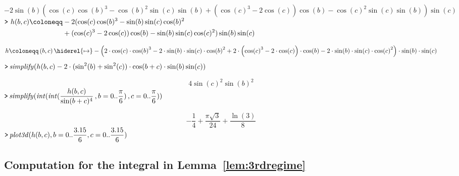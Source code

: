 \documentclass{article}
\theoremstyle{definition}
\newcounter{col}
\begin{document}
\begin{dmath}\label{(4)}
-2 \sin \! \left(b \right) \left(\cos \! \left(c \right) \cos \! \left(b \right)^{3}-\cos \! \left(b \right)^{2} \sin \! \left(c \right) \sin \! \left(b \right)+\left(\cos \! \left(c \right)^{3}-2 \cos \! \left(c \right)\right) \cos \! \left(b \right)-\cos \! \left(c \right)^{2} \sin \! \left(c \right) \sin \! \left(b \right)\right) \sin \! \left(c \right)
\end{dmath}
\mapleinput
{ \(\begin{aligned}  \texttt{>\,} \,h (b ,c)\coloneqq &-2 (\cos (c) \cos (b)^{3}-\sin (b) \sin (c) \cos (b)^{2}\\&+(\cos (c)^{3}-2 \cos (c)) \cos (b)-\sin (b) \sin (c) \cos (c)^{2}) \sin (b) \sin (c) \end{aligned}\) }

\begin{dmath}\label{(5)}
h \coloneqq \left(b ,c \right)\hiderel{\mapsto }-\left(2\cdot \cos \! \left(c \right)\cdot \cos \! \left(b \right)^{3}-2\cdot \sin \! \left(b \right)\cdot \sin \! \left(c \right)\cdot \cos \! \left(b \right)^{2}+2\cdot \left(\cos \! \left(c \right)^{3}-2\cdot \cos \! \left(c \right)\right)\cdot \cos \! \left(b \right)-2\cdot \sin \! \left(b \right)\cdot \sin \! \left(c \right)\cdot \cos \! \left(c \right)^{2}\right)\cdot \sin \! \left(b \right)\cdot \sin \! \left(c \right)
\end{dmath}
\mapleinput
{$ \displaystyle \texttt{>\,} \mathit{simplify} (h (b ,c)-2\cdot (\sin^{2}(b)+\sin^{2}(c))\cdot \cos (b +c)\cdot  \sin (b) \sin (c)) $}

\begin{dmath}\label{(6)}
4 \sin \! \left(c \right)^{2} \sin \! \left(b \right)^{2}
\end{dmath}
\mapleinput
{$ \displaystyle \texttt{>\,} \mathit{simplify} (\mathit{int} (\mathit{int} (\frac{h (b ,c)}{\sin (b +c)^{4}}\,,b =0..\frac{\pi}{6})\,,c =0..\frac{\pi}{6})) $}

\begin{dmath}\label{(7)}
-\frac{1}{4}+\frac{\pi  \sqrt{3}}{24}+\frac{\ln \! \left(3\right)}{8}
\end{dmath}
\mapleinput
{$ \displaystyle \texttt{>\,} \mathit{plot3d} (h (b ,c),b =0..\frac{ 3.15}{6},c =0..\frac{ 3.15}{6}) $}

{}


\subsection{Computation for the integral in Lemma~\ref{lem:3rdregime}}\label{subsec:integral_v2}
\end{document}
